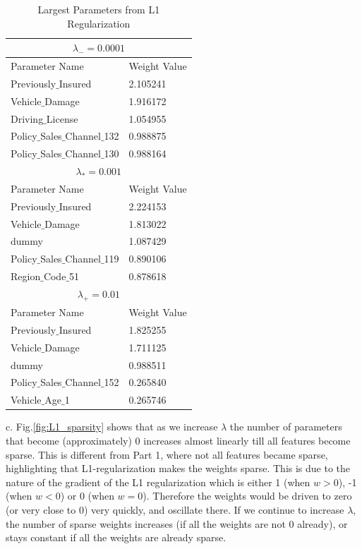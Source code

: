 \documentclass{article}
\begin{document}
\begin{table}
\caption{Largest Parameters from L1 Regularization}
\begin{tabular}{ |p{6cm}||p{6cm}|  }
 \hline 
 \multicolumn{2}{|c|}{$\lambda_{-} = 0.0001$} \\
 \hline
 Parameter Name & Weight Value\\
 \hline
Previously$\_$Insured       & 2.105241\\
Vehicle$\_$Damage           & 1.916172\\
Driving$\_$License          & 1.054955\\
Policy$\_$Sales$\_$Channel$\_$132  &0.988875\\
Policy$\_$Sales$\_$Channel$\_$130 & 0.988164\\

 \hline
 \multicolumn{2}{|c|}{$\lambda_{*} = 0.001$} \\
 \hline
 Parameter Name & Weight Value\\
 \hline
Previously$\_$Insured    &    2.224153\\
Vehicle$\_$Damage         &   1.813022\\
dummy                  &   1.087429\\
Policy$\_$Sales$\_$Channel$\_$119&  0.890106\\
Region$\_$Code$\_$51           & 0.878618\\

 
 \hline
\multicolumn{2}{|c|}{$\lambda_{+} = 0.01$} \\
 \hline
 Parameter Name & Weight Value\\
 \hline
Previously$\_$Insured   &     1.825255\\
Vehicle$\_$Damage        &    1.711125\\
dummy                  &   0.988511\\
Policy$\_$Sales$\_$Channel$\_$152&  0.265840\\
Vehicle$\_$Age$\_$1            & 0.265746\\
\hline
\end{tabular}
\label{table:L1}
\end{table}
\vspace{\baselineskip}

c. Fig.\ref{fig:L1_sparsity} shows that as we increase $\lambda$ the number of parameters that become (approximately) $0$ increases almost linearly till all features become sparse. This is different from Part 1, where not all features became sparse, highlighting that L1-regularization makes the weights sparse. This is due to the nature of the gradient of the L1 regularization which is either 1 (when $w > 0$), -1 (when $w<0$) or 0 (when $w=0$). Therefore the weights would be driven to zero (or very close to 0) very quickly, and oscillate there. If we continue to increase $\lambda$, the number of sparse weights increases (if all the weights are not 0 already), or stays constant if all the weights are already sparse.\\
\end{document}
